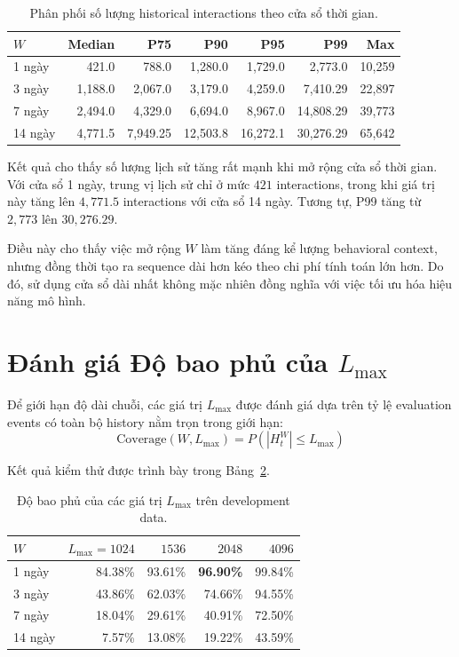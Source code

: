 \documentclass[12pt,a4paper]{article}
\begin{document}
\begin{table}[h]
\centering
\caption{Phân phối số lượng historical interactions theo cửa sổ thời gian.}
\label{tab:phase5-history-distribution}
\begin{tabular}{lrrrrrr}
\toprule
\textbf{$W$} & \textbf{Median} & \textbf{P75} & \textbf{P90} & \textbf{P95} & \textbf{P99} & \textbf{Max} \\
\midrule
1 ngày  & 421.0  & 788.0    & 1,280.0  & 1,729.0  & 2,773.0   & 10,259 \\
3 ngày  & 1,188.0 & 2,067.0  & 3,179.0  & 4,259.0  & 7,410.29  & 22,897 \\
7 ngày  & 2,494.0 & 4,329.0  & 6,694.0  & 8,967.0  & 14,808.29 & 39,773 \\
14 ngày & 4,771.5 & 7,949.25 & 12,503.8 & 16,272.1 & 30,276.29 & 65,642 \\
\bottomrule
\end{tabular}
\end{table}

Kết quả cho thấy số lượng lịch sử tăng rất mạnh khi mở rộng cửa sổ thời gian. Với cửa sổ 1 ngày, trung vị lịch sử chỉ ở mức $421$ interactions, trong khi giá trị này tăng lên $4,771.5$ interactions với cửa sổ 14 ngày. Tương tự, P99 tăng từ $2,773$ lên $30,276.29$.

Điều này cho thấy việc mở rộng $W$ làm tăng đáng kể lượng behavioral context, nhưng đồng thời tạo ra sequence dài hơn kéo theo chi phí tính toán lớn hơn. Do đó, sử dụng cửa sổ dài nhất không mặc nhiên đồng nghĩa với việc tối ưu hóa hiệu năng mô hình.

\section{Đánh giá Độ bao phủ của $L_{\max}$}
Để giới hạn độ dài chuỗi, các giá trị $L_{\max}$ được đánh giá dựa trên tỷ lệ evaluation events có toàn bộ history nằm trọn trong giới hạn:
\[
\text{Coverage}(W,L_{\max}) = P\left(|H_t^W| \leq L_{\max}\right)
\]

Kết quả kiểm thử được trình bày trong Bảng~\ref{tab:phase5-coverage}.

\begin{table}[h]
\centering
\caption{Độ bao phủ của các giá trị $L_{\max}$ trên development data.}
\label{tab:phase5-coverage}
\begin{tabular}{lrrrr}
\toprule
\textbf{$W$} & \textbf{$L_{\max}=1024$} & \textbf{$1536$} & \textbf{$2048$} & \textbf{$4096$} \\
\midrule
1 ngày  & 84.38\% & 93.61\% & \textbf{96.90\%} & 99.84\% \\
3 ngày  & 43.86\% & 62.03\% & 74.66\% & 94.55\% \\
7 ngày  & 18.04\% & 29.61\% & 40.91\% & 72.50\% \\
14 ngày & 7.57\%  & 13.08\% & 19.22\% & 43.59\% \\
\bottomrule
\end{tabular}
\end{table}
\end{document}
